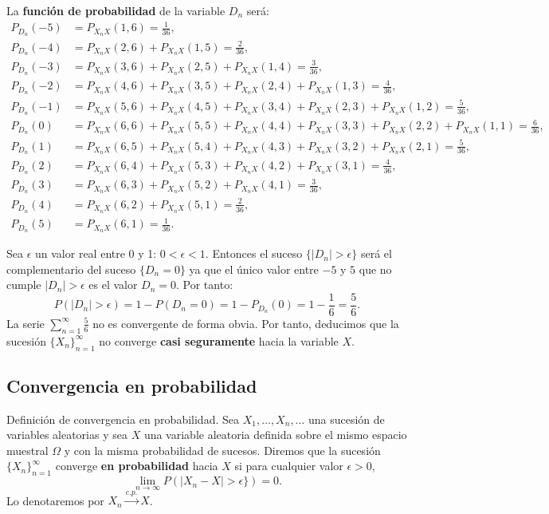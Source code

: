 \documentclass[]{book}
\begin{document}
La \textbf{función de probabilidad} de la variable \(D_n\) será:
\[
\begin{array}{rl}
P_{D_n}(-5) & =P_{X_nX}(1,6)=\frac{1}{36}, \\
P_{D_n}(-4) & =P_{X_nX}(2,6)+P_{X_nX}(1,5)=\frac{2}{36}, \\
P_{D_n}(-3) & =P_{X_nX}(3,6)+P_{X_nX}(2,5)+P_{X_nX}(1,4)=\frac{3}{36}, \\
P_{D_n}(-2) & =P_{X_nX}(4,6)+P_{X_nX}(3,5)+P_{X_nX}(2,4)+P_{X_nX}(1,3)=\frac{4}{36}, \\
P_{D_n}(-1) & =P_{X_nX}(5,6)+P_{X_nX}(4,5)+P_{X_nX}(3,4)+P_{X_nX}(2,3)+P_{X_nX}(1,2)=\frac{5}{36}, \\
P_{D_n}(0) & =P_{X_nX}(6,6)+P_{X_nX}(5,5)+P_{X_nX}(4,4)+P_{X_nX}(3,3)+P_{X_nX}(2,2)+P_{X_nX}(1,1)=\frac{6}{36}, \\
P_{D_n}(1) & =P_{X_nX}(6,5)+P_{X_nX}(5,4)+P_{X_nX}(4,3)+P_{X_nX}(3,2)+P_{X_nX}(2,1)=\frac{5}{36}, \\
P_{D_n}(2) & =P_{X_nX}(6,4)+P_{X_nX}(5,3)+P_{X_nX}(4,2)+P_{X_nX}(3,1)=\frac{4}{36}, \\
P_{D_n}(3) & =P_{X_nX}(6,3)+P_{X_nX}(5,2)+P_{X_nX}(4,1)=\frac{3}{36}, \\
P_{D_n}(4) & =P_{X_nX}(6,2)+P_{X_nX}(5,1)=\frac{2}{36}, \\
P_{D_n}(5) & =P_{X_nX}(6,1)=\frac{1}{36}.
\end{array}
\]

Sea \(\epsilon\) un valor real entre 0 y 1: \(0<\epsilon <1\). Entonces el suceso \(\{|D_n|>\epsilon\}\) será el complementario del suceso \(\{D_n=0\}\) ya que el único valor entre \(-5\) y \(5\) que no cumple \(|D_n|>\epsilon\) es el valor \(D_n=0\). Por tanto:
\[
P(|D_n|>\epsilon)=1-P(D_n=0)=1-P_{D_n}(0)=1-\frac{1}{6}=\frac{5}{6}.
\]
La serie \(\sum\limits_{n=1}^\infty \frac{5}{6}\) no es convergente de forma obvia. Por tanto, deducimos que la sucesión \(\{X_n\}_{n=1}^\infty\) no converge \textbf{casi seguramente} hacia la variable \(X\).

\hypertarget{convergencia-en-probabilidad}{%
\subsection{Convergencia en probabilidad}\label{convergencia-en-probabilidad}}

 Definición de convergencia en probabilidad.
Sea \(X_1,\ldots,X_n,\ldots\) una sucesión de variables aleatorias y sea \(X\) una variable aleatoria definida sobre el mismo espacio muestral \(\Omega\) y con la misma probabilidad de sucesos. Diremos que la sucesión \(\{X_n\}_{n=1}^\infty\) converge \textbf{en probabilidad} hacia \(X\) si para cualquier valor \(\epsilon >0\),
\[
\lim_{n\to\infty} P(|X_n-X|>\epsilon \})=0.
\]
Lo denotaremos por \(X_n\stackrel{c.p.}{\longrightarrow}X\).
\end{document}
